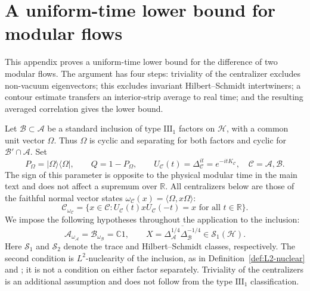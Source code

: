 \documentclass[a4paper,11pt]{article}
\theoremstyle{definition}
\begin{document}
\section{A uniform-time lower bound for modular flows}
\label{app:uniform-lower-bound}

This appendix proves a uniform-time lower bound for the difference of two modular flows. The argument has four steps: triviality of the centralizer excludes non-vacuum eigenvectors; this excludes invariant Hilbert--Schmidt intertwiners; a contour estimate transfers an interior-strip average to real time; and the resulting averaged correlation gives the lower bound.

Let $\mathcal B\subset\mathcal A$ be a standard inclusion of type $\mathrm{III}_1$ factors on $\mathcal H$, with a common unit vector $\Omega$. Thus $\Omega$ is cyclic and separating for both factors and cyclic for $\mathcal B'\cap\mathcal A$. Set
\begin{equation}
 P_\Omega=|\Omega\rangle\langle\Omega|,\qquad Q=1-P_\Omega,\qquad
 U_{\mathcal C}(t)=\Delta_{\mathcal C}^{it}=e^{-itK_{\mathcal C}},
 \quad \mathcal C=\mathcal A,\mathcal B .
 \label{eq:appC-conventions}
\end{equation}
The sign of this parameter is opposite to the physical modular time in the main text and does not affect a supremum over $\mathbb R$. All centralizers below are those of the faithful normal vector states $\omega_{\mathcal C}(x)=\langle\Omega,x\Omega\rangle$:
\begin{equation}
 \mathcal C_{\omega_{\mathcal C}}
 =\{x\in\mathcal C:U_{\mathcal C}(t)xU_{\mathcal C}(-t)=x
 \text{ for all }t\in\mathbb R\}.
 \label{eq:appC-centralizers}
\end{equation}
We impose the following hypotheses throughout the application to the inclusion:
\begin{equation}
 \mathcal A_{\omega_{\mathcal A}}=\mathcal B_{\omega_{\mathcal B}}=\mathbb C1,
 \qquad
 X=\overline{\Delta_{\mathcal A}^{1/4}\Delta_{\mathcal B}^{-1/4}}
 \in\mathcal S_1(\mathcal H).
 \label{eq:appC-nuclear}
\end{equation}
Here $\mathcal S_1$ and $\mathcal S_2$ denote the trace and Hilbert--Schmidt classes, respectively. The second condition is $L^2$-nuclearity of the inclusion, as in Definition~\ref{def:L2-nuclear} and \cite[Section~5]{BDL2007}; it is not a condition on either factor separately. Triviality of the centralizers is an additional assumption and does not follow from the type $\mathrm{III}_1$ classification.
\end{document}
